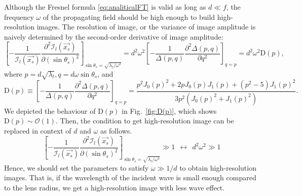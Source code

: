 \documentclass[a4paper,11pt]{article}
\begin{document}
	Although the Fresnel formula \eqref{eq:analiticalFT} is valid as long as $d \ll f$, the frequency $\omega$ of the propagating field should be high enough to build high-resolution images. The resolution of image, or the variance of image amplitude is naively determined by the second-order derivative of image amplitude:
	\begin{equation}
	    \left[-\frac{1}{\mathcal{I}_l(\vec{x_s})}\frac{\partial^2\mathcal{I}_l(\vec{x_s})}{\partial(\sin\theta_s)^2}\right]_{\sin\theta_s=\sqrt{\lambda_l/\omega^2}}
	    =d^2\omega^2\left[-\frac{1}{\Delta(p,q)}\frac{\partial^2\Delta(p,q)}{\partial q^2}\right]_{q=p}
	    =d^2 \omega^2 \mathrm{D}(p),
	\end{equation}
    where $p=d\sqrt{\lambda_l}, q=d\omega\sin\theta_s$, and
	\begin{equation}
	    \mathrm{D}(p)
	    \equiv\left[-\frac{1}{\Delta(p,q)}\frac{\partial^2\Delta(p,q)}{\partial q^2}\right]_{q=p}
	    =\frac{p^2 J_0(p)^2+2 p J_0(p)J_1(p)+(p^2-5)J_1(p)^2}{3 p^2 \left(J_0(p)^2+J_1(p)^2\right)}.
	\end{equation}
	We depicted the behaviour of $\mathrm{D}(p)$ in Fig.~\ref{fig:D(p)}, which shows $\mathrm{D}(p)\sim \mathcal{O}(1)$. Then, the condition to get high-resolution image can be replaced in context of $d$ and $\omega$ as follows.
	\begin{equation}
	    \left[-\frac{1}{\mathcal{I}_l(\vec{x_s})}\frac{\partial^2\mathcal{I}_l(\vec{x_s})}{\partial(\sin\theta_s)^2}\right]_{\sin\theta_s=\sqrt{\lambda_l/\omega^2}}\gg 1
	    \ \ \leftrightarrow\ \ 
	    d^2 \omega^2 \gg 1
	\end{equation}
	Hence, we should set the parameters to satisfy $\omega \gg 1/d$ to obtain high-resolution images.
    That is, if the wavelength of the incident wave is small enough compared to the lens radius, we get a high-resolution image with less wave effect.
\end{document}
